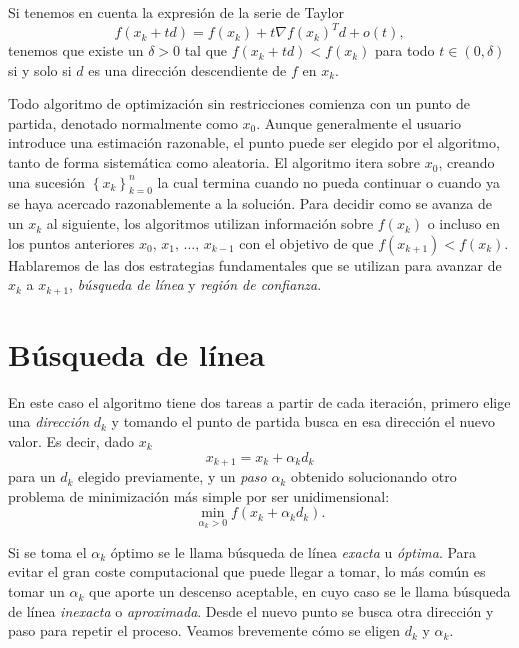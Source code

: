 \documentclass[11pt,a4paper]{book}
\theoremstyle{definition}
\theoremstyle{remark}
\begin{document}
Si tenemos en cuenta la expresión de la serie de Taylor
\begin{equation}
	f(x_k + td) = f(x_k) + t \nabla f(x_k)^Td + o(t),
\end{equation}
tenemos que existe un $\delta > 0$ tal que $f(x_k + td) < f(x_k)$ para todo
$t \in (0, \delta)$ si y solo si $d$ es una dirección descendiente de $f$ en $x_k$.

Todo algoritmo de optimización sin restricciones comienza con un punto de partida, denotado normalmente como $x_{0}$. Aunque generalmente el usuario introduce una estimación razonable, el punto puede ser elegido por el algoritmo, tanto de forma sistemática como aleatoria. El algoritmo itera sobre $x_{0}$, creando una sucesión $\left\{x_k\right\}_{k=0}^n$ la cual termina cuando no pueda continuar o cuando ya se haya acercado razonablemente a la solución. Para decidir como se avanza de un $x_k$ al siguiente, los algoritmos utilizan información sobre $f(x_k)$ o incluso en los puntos anteriores $x_0,\, x_1,\, \ldots,\,x_{k-1}$ con el objetivo de que $f(x_{k+1})<f(x_{k})$. Hablaremos de las dos estrategias fundamentales que se utilizan para avanzar de $x_k$ a $x_{k+1}$, \textit{búsqueda de línea} y \textit{región de confianza}.

\section{Búsqueda de línea}

En este caso el algoritmo tiene dos tareas a partir de cada iteración, primero elige una \textit{dirección} $d_k$ y tomando el punto de partida busca en esa dirección el nuevo valor. Es decir, dado $x_k$
\begin{equation}
	x_{k+1} = x_k + \alpha_kd_k
\end{equation}
para un $d_k$ elegido previamente, y un \textit{paso} $\alpha_k$ obtenido solucionando otro problema de minimización más simple por ser unidimensional:
\begin{equation}
	\min_{\alpha_k>0}f\left(x_k+\alpha_kd_k\right).
	\label{min:alphak}
\end{equation}

Si se toma el $\alpha_k$ óptimo se le llama búsqueda de línea \textit{exacta} u \textit{óptima}. Para evitar el gran coste computacional que puede llegar a tomar, lo más común es tomar un $\alpha_k$ que aporte un descenso aceptable, en cuyo caso se le llama búsqueda de línea \textit{inexacta} o \textit{aproximada}. Desde el nuevo punto se busca otra dirección y paso para repetir el proceso.
Veamos brevemente cómo se eligen $d_k$ y $\alpha_k$.
\end{document}
